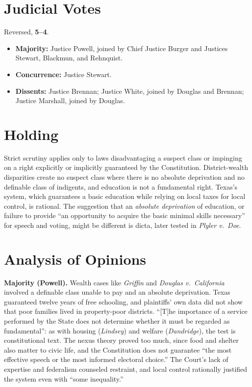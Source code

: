 \documentclass[12pt]{article}
\begin{document}
\section{Judicial Votes}

Reversed, \textbf{5--4}.
\begin{itemize}
\item \textbf{Majority:} Justice Powell, joined by Chief Justice Burger and Justices Stewart, Blackmun, and Rehnquist.
\item \textbf{Concurrence:} Justice Stewart.
\item \textbf{Dissents:} Justice Brennan; Justice White, joined by Douglas and Brennan; Justice Marshall, joined by Douglas.
\end{itemize}

\section{Holding}

Strict scrutiny applies only to laws disadvantaging a suspect class or impinging on a right explicitly or implicitly guaranteed by the Constitution. District-wealth disparities create no suspect class where there is no absolute deprivation and no definable class of indigents, and education is not a fundamental right. Texas's system, which guarantees a basic education while relying on local taxes for local control, is rational. The suggestion that an \emph{absolute deprivation} of education, or failure to provide ``an opportunity to acquire the basic minimal skills necessary'' for speech and voting, might be different is dicta, later tested in \textit{Plyler v.\ Doe}.

\section{Analysis of Opinions}

\textbf{Majority (Powell).} Wealth cases like \textit{Griffin} and \textit{Douglas v.\ California} involved a definable class unable to pay and an absolute deprivation. Texas guaranteed twelve years of free schooling, and plaintiffs' own data did not show that poor families lived in property-poor districts. ``[T]he importance of a service performed by the State does not determine whether it must be regarded as fundamental'': as with housing (\textit{Lindsey}) and welfare (\textit{Dandridge}), the test is constitutional text. The nexus theory proved too much, since food and shelter also matter to civic life, and the Constitution does not guarantee ``the most effective speech or the most informed electoral choice.'' The Court's lack of expertise and federalism counseled restraint, and local control rationally justified the system even with ``some inequality.''
\end{document}
